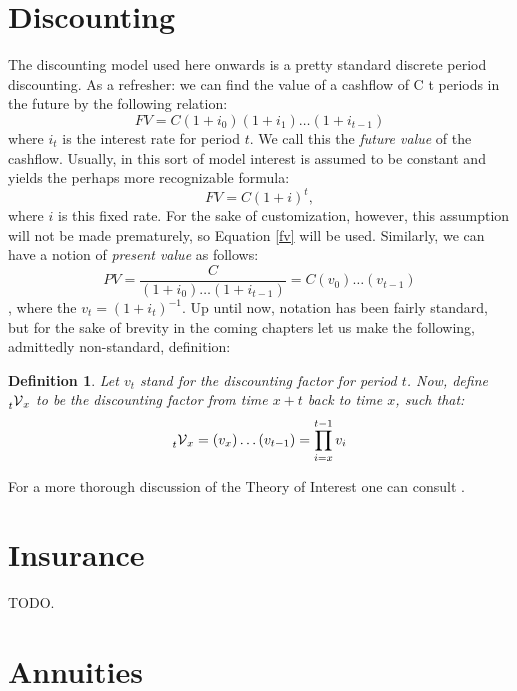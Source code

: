 \documentclass[a4paper]{report}
\newtheorem{definition}{Definition}
\newcommand{\disc}[2]{\prescript{}{#1}{\mathcal{V}}_{#2}}
\begin{document}
  \section{Discounting}
  The discounting model used here onwards is a pretty 
  standard discrete period discounting.
  As a refresher: we can find the value of a cashflow of C
  t periods in the future by the following relation: 
  \begin{equation}\label{fv}
    FV = C(1+i_0)(1+i_1)\ldots(1+i_{t-1})
  \end{equation}
  where $i_t$ is the interest rate for period $t$.
  We call this the \textit{future value} of the cashflow.
  Usually, in this sort of model interest is assumed to be 
  constant and yields the perhaps more recognizable formula:
   \[
     FV = C(1+i)^{t}
  ,\]
  where $i$ is this fixed rate.
  For the sake of customization, however, this assumption 
  will not be made prematurely, so Equation \ref{fv} will 
  be used.
  Similarly, we can have a notion of \textit{present value}
  as follows:
  \begin{equation}
    PV = \frac{C}{(1+i_0)\ldots(1+i_{t-1})} 
    = C(v_0)\ldots(v_{t-1})
  \end{equation}
  , where the $v_t=(1+i_t)^{-1}$.
  Up until now, notation has been fairly standard, but for 
  the sake of brevity in the coming chapters let us make
  the following, admittedly non-standard, definition:
  \begin{definition}
    Let $v_t$ stand for the discounting factor for period 
    $t$. Now, define $\disc{t}{x}$ to be the discounting 
    factor from time $x+t$ back to time $x$, such that:
    \begin{equation}
      \disc{t}{x} = (v_x)\ldots (v_{t-1}) 
      = \prod_{i=x}^{t-1} v_i
    \end{equation}
  \end{definition}
  
  For a more thorough discussion of the Theory of Interest 
  one can consult \textcite{kellison}.

  \section{Insurance}

   TODO. 

  \section{Annuities}
  
\end{document}

